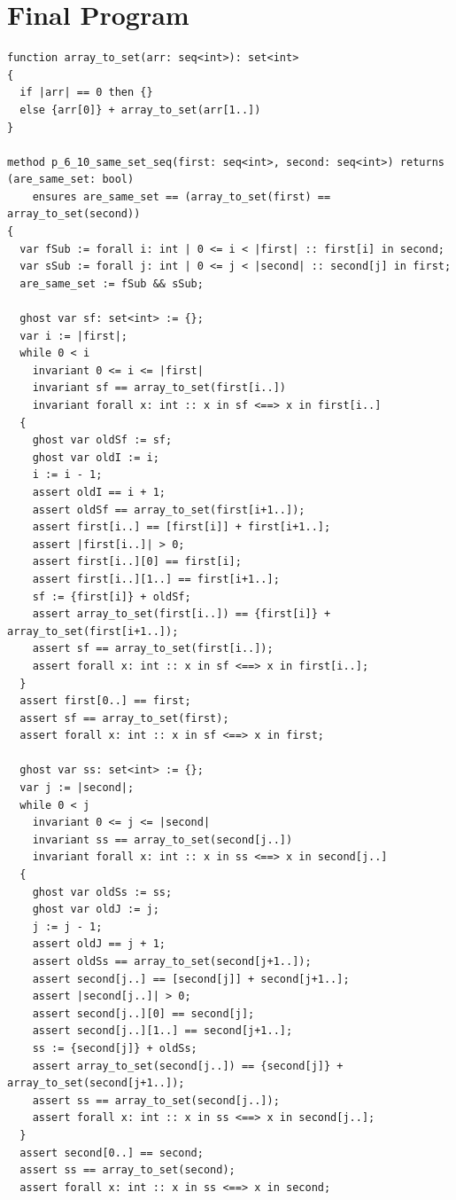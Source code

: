 \documentclass{article}
\begin{document}
\section*{Final Program}
\begin{lstlisting}
function array_to_set(arr: seq<int>): set<int>
{
  if |arr| == 0 then {}
  else {arr[0]} + array_to_set(arr[1..])
}

method p_6_10_same_set_seq(first: seq<int>, second: seq<int>) returns (are_same_set: bool)
	ensures are_same_set == (array_to_set(first) == array_to_set(second))
{
  var fSub := forall i: int | 0 <= i < |first| :: first[i] in second;
  var sSub := forall j: int | 0 <= j < |second| :: second[j] in first;
  are_same_set := fSub && sSub;

  ghost var sf: set<int> := {};
  var i := |first|;
  while 0 < i
    invariant 0 <= i <= |first|
    invariant sf == array_to_set(first[i..])
    invariant forall x: int :: x in sf <==> x in first[i..]
  {
    ghost var oldSf := sf;
    ghost var oldI := i;
    i := i - 1;
    assert oldI == i + 1;
    assert oldSf == array_to_set(first[i+1..]);
    assert first[i..] == [first[i]] + first[i+1..];
    assert |first[i..]| > 0;
    assert first[i..][0] == first[i];
    assert first[i..][1..] == first[i+1..];
    sf := {first[i]} + oldSf;
    assert array_to_set(first[i..]) == {first[i]} + array_to_set(first[i+1..]);
    assert sf == array_to_set(first[i..]);
    assert forall x: int :: x in sf <==> x in first[i..];
  }
  assert first[0..] == first;
  assert sf == array_to_set(first);
  assert forall x: int :: x in sf <==> x in first;

  ghost var ss: set<int> := {};
  var j := |second|;
  while 0 < j
    invariant 0 <= j <= |second|
    invariant ss == array_to_set(second[j..])
    invariant forall x: int :: x in ss <==> x in second[j..]
  {
    ghost var oldSs := ss;
    ghost var oldJ := j;
    j := j - 1;
    assert oldJ == j + 1;
    assert oldSs == array_to_set(second[j+1..]);
    assert second[j..] == [second[j]] + second[j+1..];
    assert |second[j..]| > 0;
    assert second[j..][0] == second[j];
    assert second[j..][1..] == second[j+1..];
    ss := {second[j]} + oldSs;
    assert array_to_set(second[j..]) == {second[j]} + array_to_set(second[j+1..]);
    assert ss == array_to_set(second[j..]);
    assert forall x: int :: x in ss <==> x in second[j..];
  }
  assert second[0..] == second;
  assert ss == array_to_set(second);
  assert forall x: int :: x in ss <==> x in second;


\end{lstlisting}
\end{document}

